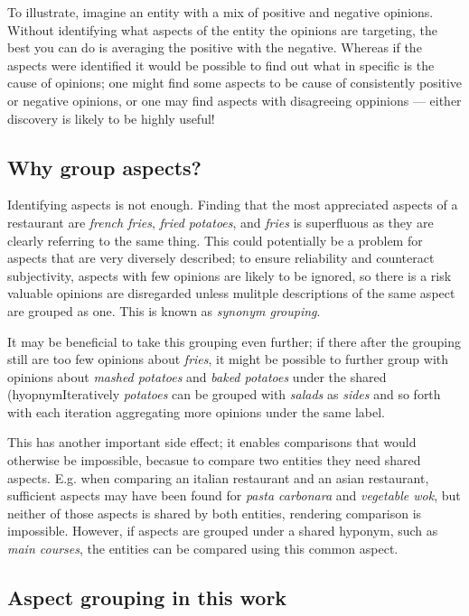 \documentclass[a4paper,11pt]{kth-mag}
\begin{document}
To illustrate, imagine an entity with a mix of positive and negative opinions.
Without identifying what aspects of the entity the opinions are targeting, the best
you can do is averaging the positive with the negative.
Whereas if the aspects were identified 
it would be possible to find out what in specific is the cause of opinions;
one might find some aspects to be cause of consistently positive or negative opinions,
or one may find aspects with disagreeing oppinions
--- either discovery is likely to be highly useful!

\subsection{Why group aspects?}
Identifying aspects is not enough. Finding that the
most appreciated aspects of a restaurant are \emph{french fries},
\emph{fried potatoes}, and \emph{fries} is superfluous as they are
clearly referring to the same thing.
This could potentially be a problem for aspects that are very diversely described;
to ensure reliability and counteract subjectivity, aspects with few opinions are
likely to be ignored, so there is a risk valuable opinions are disregarded unless
mulitple descriptions of the same aspect are grouped as one. This is known as \emph{synonym grouping}.


It may be beneficial to take this grouping even further;
if there after the grouping still are too few opinions about \emph{fries},
it might be possible to further group with opinions about \emph{mashed potatoes}
and \emph{baked potatoes} under the shared (hyopnymIteratively \emph{potatoes} can
be grouped with \emph{salads} as \emph{sides} and so forth with each iteration aggregating
more opinions under the same label.

This has another important side effect; it enables comparisons that would otherwise
be impossible, becasue to compare two entities they need shared aspects.
E.g. when comparing an italian restaurant and an asian restaurant, sufficient aspects may
have been found for \emph{pasta carbonara} and \emph{vegetable wok}, but neither of
those aspects is shared by both entities, rendering comparison is impossible.
However, if aspects are grouped under a shared hyponym, such as \emph{main courses},
the entities can be compared using this common aspect.


\subsection{Aspect grouping in this work}
\end{document}

